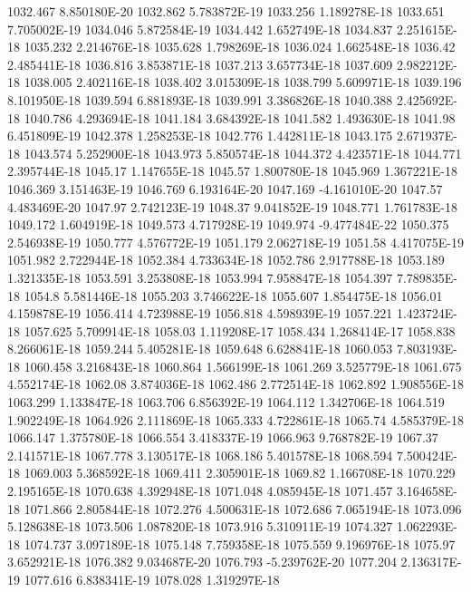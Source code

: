 1032.467  8.850180E-20
1032.862  5.783872E-19
1033.256  1.189278E-18
1033.651  7.705002E-19
1034.046  5.872584E-19
1034.442  1.652749E-18
1034.837  2.251615E-18
1035.232  2.214676E-18
1035.628  1.798269E-18
1036.024  1.662548E-18
1036.42  2.485441E-18
1036.816  3.853871E-18
1037.213  3.657734E-18
1037.609  2.982212E-18
1038.005  2.402116E-18
1038.402  3.015309E-18
1038.799  5.609971E-18
1039.196  8.101950E-18
1039.594  6.881893E-18
1039.991  3.386826E-18
1040.388  2.425692E-18
1040.786  4.293694E-18
1041.184  3.684392E-18
1041.582  1.493630E-18
1041.98  6.451809E-19
1042.378  1.258253E-18
1042.776  1.442811E-18
1043.175  2.671937E-18
1043.574  5.252900E-18
1043.973  5.850574E-18
1044.372  4.423571E-18
1044.771  2.395744E-18
1045.17  1.147655E-18
1045.57  1.800780E-18
1045.969  1.367221E-18
1046.369  3.151463E-19
1046.769  6.193164E-20
1047.169  -4.161010E-20
1047.57  4.483469E-20
1047.97  2.742123E-19
1048.37  9.041852E-19
1048.771  1.761783E-18
1049.172  1.604919E-18
1049.573  4.717928E-19
1049.974  -9.477484E-22
1050.375  2.546938E-19
1050.777  4.576772E-19
1051.179  2.062718E-19
1051.58  4.417075E-19
1051.982  2.722944E-18
1052.384  4.733634E-18
1052.786  2.917788E-18
1053.189  1.321335E-18
1053.591  3.253808E-18
1053.994  7.958847E-18
1054.397  7.789835E-18
1054.8  5.581446E-18
1055.203  3.746622E-18
1055.607  1.854475E-18
1056.01  4.159878E-19
1056.414  4.723988E-19
1056.818  4.598939E-19
1057.221  1.423724E-18
1057.625  5.709914E-18
1058.03  1.119208E-17
1058.434  1.268414E-17
1058.838  8.266061E-18
1059.244  5.405281E-18
1059.648  6.628841E-18
1060.053  7.803193E-18
1060.458  3.216843E-18
1060.864  1.566199E-18
1061.269  3.525779E-18
1061.675  4.552174E-18
1062.08  3.874036E-18
1062.486  2.772514E-18
1062.892  1.908556E-18
1063.299  1.133847E-18
1063.706  6.856392E-19
1064.112  1.342706E-18
1064.519  1.902249E-18
1064.926  2.111869E-18
1065.333  4.722861E-18
1065.74  4.585379E-18
1066.147  1.375780E-18
1066.554  3.418337E-19
1066.963  9.768782E-19
1067.37  2.141571E-18
1067.778  3.130517E-18
1068.186  5.401578E-18
1068.594  7.500424E-18
1069.003  5.368592E-18
1069.411  2.305901E-18
1069.82  1.166708E-18
1070.229  2.195165E-18
1070.638  4.392948E-18
1071.048  4.085945E-18
1071.457  3.164658E-18
1071.866  2.805844E-18
1072.276  4.500631E-18
1072.686  7.065194E-18
1073.096  5.128638E-18
1073.506  1.087820E-18
1073.916  5.310911E-19
1074.327  1.062293E-18
1074.737  3.097189E-18
1075.148  7.759358E-18
1075.559  9.196976E-18
1075.97  3.652921E-18
1076.382  9.034687E-20
1076.793  -5.239762E-20
1077.204  2.136317E-19
1077.616  6.838341E-19
1078.028  1.319297E-18
